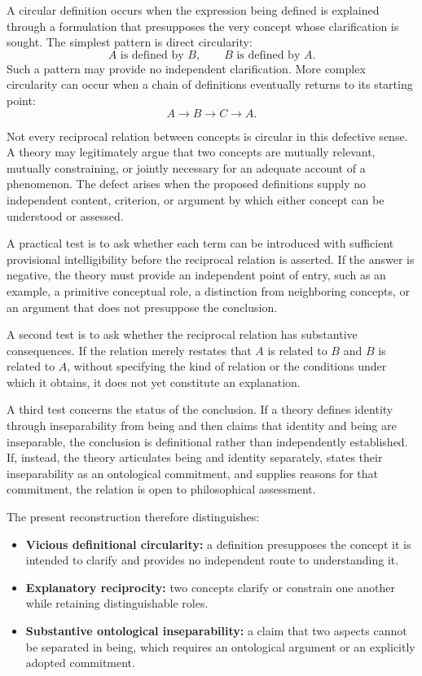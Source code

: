A circular definition occurs when the expression being defined is
explained through a formulation that presupposes the very concept
whose clarification is sought. The simplest pattern is direct
circularity:
\[
  A \text{ is defined by } B,
  \qquad
  B \text{ is defined by } A.
\]
Such a pattern may provide no independent clarification. More
complex circularity can occur when a chain of definitions eventually
returns to its starting point:
\[
  A \longrightarrow B \longrightarrow C
  \longrightarrow A.
\]

Not every reciprocal relation between concepts is circular in this
defective sense. A theory may legitimately argue that two concepts
are mutually relevant, mutually constraining, or jointly necessary
for an adequate account of a phenomenon. The defect arises when the
proposed definitions supply no independent content, criterion, or
argument by which either concept can be understood or assessed.

A practical test is to ask whether each term can be introduced with
sufficient provisional intelligibility before the reciprocal
relation is asserted. If the answer is negative, the theory must
provide an independent point of entry, such as an example, a
primitive conceptual role, a distinction from neighboring concepts,
or an argument that does not presuppose the conclusion.

A second test is to ask whether the reciprocal relation has
substantive consequences. If the relation merely restates that
\(A\) is related to \(B\) and \(B\) is related to \(A\), without
specifying the kind of relation or the conditions under which it
obtains, it does not yet constitute an explanation.

A third test concerns the status of the conclusion. If a theory
defines identity through inseparability from being and then claims
that identity and being are inseparable, the conclusion is
definitional rather than independently established. If, instead,
the theory articulates being and identity separately, states their
inseparability as an ontological commitment, and supplies reasons
for that commitment, the relation is open to philosophical
assessment.

The present reconstruction therefore distinguishes:

\begin{itemize}
  \item \textbf{Vicious definitional circularity:} a definition
  presupposes the concept it is intended to clarify and provides
  no independent route to understanding it.
  \item \textbf{Explanatory reciprocity:} two concepts clarify or
  constrain one another while retaining distinguishable roles.
  \item \textbf{Substantive ontological inseparability:} a claim
  that two aspects cannot be separated in being, which requires
  an ontological argument or an explicitly adopted commitment.
\end{itemize}

